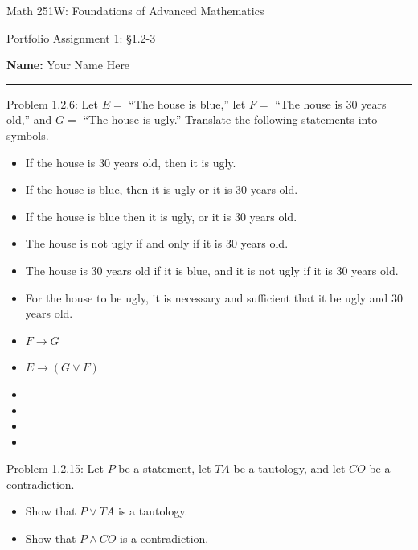 \documentclass{article}
\theoremstyle{definition}
\begin{document}
	\begin{center}
		\Large{Math 251W: Foundations of Advanced Mathematics}

		\normalsize{Portfolio Assignment 1: \S 1.2-3}

		\vspace{0.2cm}

		\hfill {\bf Name:} Your Name Here

		\vspace{0.25cm}
		\hrule
	\end{center}

	\vspace{0.3cm}

	\noindent Problem 1.2.6: Let $E=$ ``The house is blue,'' let $F=$ ``The house is 30 years old,'' and $G=$ ``The house is ugly.'' Translate the following statements into symbols.

	\begin{itemize}
		\item[(1)] If the house is 30 years old, then it is ugly.
		\item[(2)] If the house is blue, then it is ugly or it is 30 years old.
		\item[(3)] If the house is blue then it is ugly, or it is 30 years old.
		\item[(4)] The house is not ugly if and only if it is 30 years old.
		\item[(5)] The house is 30 years old if it is blue, and it is not ugly if it is 30 years old.
		\item[(6)] For the house to be ugly, it is necessary and sufficient that it be ugly and 30 years old.
	\end{itemize}
	\vspace{0.25cm}

	\begin{itemize}
		\item[(1)] $F\rightarrow G$
		\item[(2)] $E\rightarrow(G\vee F)$
		\item[(3)]
		\item[(4)]
		\item[(5)]
		\item[(6)]
	\end{itemize}

	\vspace{.5cm}


	\noindent Problem 1.2.15: Let $P$ be a statement, let $TA$ be a tautology, and let $CO$ be a contradiction.
	\begin{itemize}
		\item[(1)] Show that $P\vee TA$ is a tautology.
		\item[(2)] Show that $P\wedge CO$ is a contradiction.
	\end{itemize}
\end{document}
